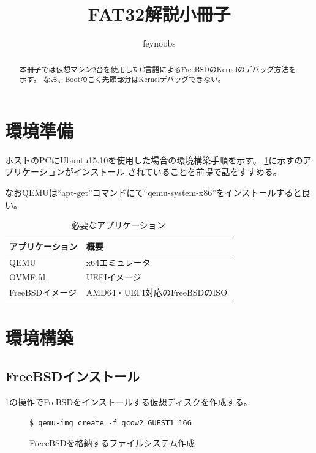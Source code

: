 \documentclass[a4j]{jarticle}
\title{FAT32解説小冊子}
\author{feynoobs}
\begin{document}
\maketitle

\begin{abstract}
本冊子では仮想マシン2台を使用したC言語によるFreeBSDのKernelのデバッグ方法を示す。
なお、Bootのごく先頭部分はKernelデバッグできない。
\end{abstract}

\section{環境準備}
ホストのPCにUbuntu15.10を使用した場合の環境構築手順を示す。
\ref{tb:FreeBSD:_ENV}に示すのアプリケーションがインストール
されていることを前提で話をすすめる。

なおQEMUは``apt-get''コマンドにて``qemu-system-x86''をインストールすると良い。
\begin{table}[htp]
	\caption{必要なアプリケーション}
	\label{tb:FreeBSD:_ENV}
	\begin{center}
		\begin{tabular}{|l|p{10cm}|}									\hline
			アプリケーション	&	概要							\\	\hline	\hline
			QEMU				&	x64エミュレータ				\\	\hline
			OVMF.fd				&	UEFIイメージ					\\	\hline
			FreeBSDイメージ		&	AMD64・UEFI対応のFreeBSDのISO	\\	\hline
		\end{tabular}
	\end{center}
\end{table}

\section{環境構築}
\subsection{FreeBSDインストール}
\label{sec:FreeBSD_inst}
\ref{fig:FreeBSD_CREATE}の操作でFreBSDをインストールする仮想ディスクを作成する。
\begin{figure}[htbp]
	\begin{center}
  		\begin{lstlisting}[basicstyle=\ttfamily\footnotesize, frame=single, breaklines=true]
$ qemu-img create -f qcow2 GUEST1 16G
  		\end{lstlisting}
	\end{center}
	\caption{FreeeBSDを格納するファイルシステム作成}
	\label{fig:FreeBSD_CREATE}
\end{figure}
\end{document}
